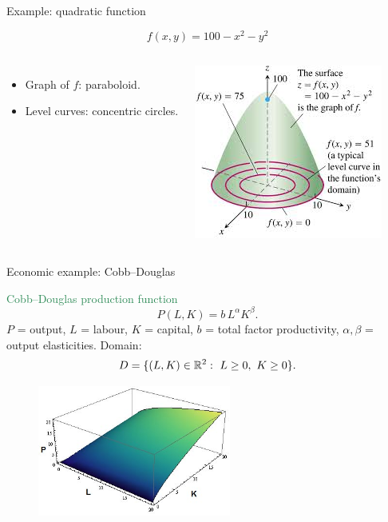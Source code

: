 \documentclass[11pt,aspectratio=169]{beamer}
\begin{document}
\begin{frame}{Example: quadratic function}

\[
f(x,y)=100-x^2-y^2
\]

\begin{columns}
\begin{itemize}
\item Graph of $f$: paraboloid.
\item Level curves: concentric circles.
\end{itemize}

\includegraphics[width=\textwidth]{img/level_curve}
\end{columns}
\end{frame}
\begin{frame}{Economic example: Cobb--Douglas}

\textcolor{SeaGreen}{Cobb--Douglas production function}
\[
P(L,K)=b\,L^{\alpha}K^{\beta}.
\]
{\footnotesize
\(P\) = output, \(L\) = labour, \(K\) = capital, \(b\) = total factor productivity, \(\alpha,\beta\) = output elasticities.}
\vskip 6pt
Domain:
\[
D=\{(L,K)\in\mathbb R^2:\ L\ge 0,\ K\ge 0\}.
\]

\begin{figure}
\includegraphics[width=2.5in]{img/cd.jpg}
\end{figure}
\end{frame}
\end{document}
